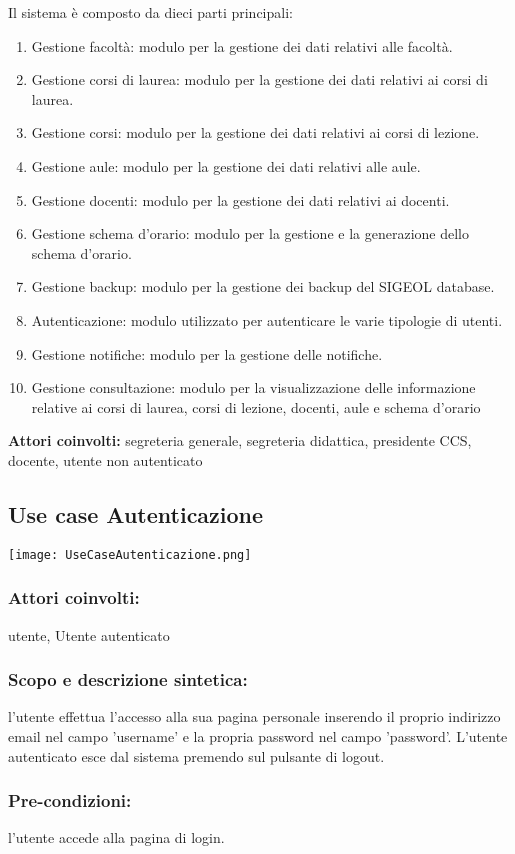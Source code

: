 \documentclass[11pt,a4paper]{article}
\begin{document}
Il sistema è composto da dieci parti principali:
\begin{enumerate}
\item Gestione facoltà: modulo per la gestione dei dati relativi alle facoltà. 
\item Gestione corsi di laurea: modulo per la gestione dei dati relativi ai corsi di laurea.
\item Gestione corsi: modulo per la gestione dei dati relativi ai corsi di lezione.
\item Gestione aule: modulo per la gestione dei dati relativi alle aule.
\item Gestione docenti: modulo per la gestione dei dati relativi ai docenti.
\item Gestione schema d'orario: modulo per la gestione e la generazione dello schema d'orario.
\item Gestione backup: modulo per la gestione dei backup del SIGEOL database.
\item Autenticazione: modulo utilizzato per autenticare le varie tipologie di utenti.
\item Gestione notifiche: modulo per la gestione delle notifiche.
\item Gestione consultazione: modulo per la visualizzazione delle informazione relative ai corsi di laurea, corsi di lezione, docenti, aule e schema d'orario
\end{enumerate}
\textbf{Attori coinvolti:}
segreteria generale, segreteria didattica, presidente CCS, docente, utente non autenticato
\subsection{Use case Autenticazione}
\begin{center} 
 \texttt{[image: UseCaseAutenticazione.png]}
\end{center}
\subsubsection*{Attori coinvolti:}
utente, Utente autenticato
\subsubsection*{Scopo e descrizione sintetica:}
l'utente effettua l'accesso alla sua pagina personale inserendo il proprio indirizzo email nel campo 'username' e la propria password
nel campo 'password'.
L'utente autenticato esce dal sistema premendo sul pulsante di logout.
\subsubsection*{Pre-condizioni:}
l'utente accede alla pagina di login.
\end{document}
